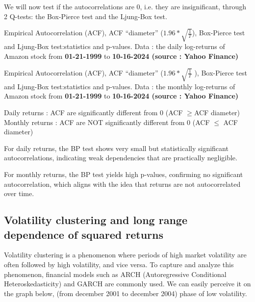 \documentclass{article}
\begin{document}
We will now test if the autocorrelations are 0, i.e. they are insignificant, through 2 Q-tests:
the Box-Pierce test and the Ljung-Box test.

\begin{table}[H]

    \centering
      
    \caption{Empirical Autocorrelation (ACF), ACF “diameter” ($1.96 * \sqrt{\frac{1}{T}}$), Box-Pierce test and Ljung-Box test:statistics and p-values. Data : the daily log-returns of Amazon stock from \textbf{01-21-1999} to \textbf{10-16-2024 (source : Yahoo Finance)}}
    \label{tab:LB_BPd}
\end{table}
\begin{table}[H]

    \centering
      
    \caption{Empirical Autocorrelation (ACF), ACF “diameter” ($1.96 * \sqrt{\frac{1}{T}}$ ), Box-Pierce test and Ljung-Box test:statistics and p-values. Data : the monthly log-returns of Amazon stock from \textbf{01-21-1999} to \textbf{10-16-2024 (source : Yahoo Finance)}}
    \label{tab:LB_BPm}
\end{table}


Daily returns : ACF are significantly different from 0 (ACF $\geq$ACF diameter)
Monthly returns :  ACF are NOT significantly different from 0 (ACF $\leq$ ACF diameter)

\noindent For daily returns, the BP test shows very small but statistically significant autocorrelations, indicating weak dependencies that are practically negligible.

\noindent For monthly returns, the BP test yields high p-values, confirming no significant autocorrelation, which aligns with the idea that returns are not autocorrelated over time.

\subsection{Volatility clustering and long range dependence of squared returns}

Volatility clustering is a phenomenon where periods of high market volatility are often followed by high volatility, and vice versa. To capture and analyze this phenomenon, financial models such as ARCH (Autoregressive Conditional Heteroskedasticity) and GARCH are commonly used. We can easily perceive it on the graph below, (from december 2001 to december 2004) phase of low volatility.
\end{document}
